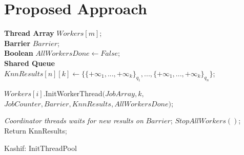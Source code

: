 \section{Proposed Approach}
\label{sec:system-architecture}

\iffalse
\small
\begin{algorithm}
	\DontPrintSemicolon
	\caption{{\sc BuildIndex}}
	\label{algo:build_index}
\end{algorithm}

\small
\fi




\small
\begin{algorithm}
	\DontPrintSemicolon %
	
	\vspace{.2cm}
	\textbf{Thread Array} $Workers[m]$;\\
	\textbf{Barrier} $Barrier$; \\
	\textbf{Boolean} $AllWorkersDone \gets False$;\\
	\textbf{Shared Queue} $KnnResults[n][k] \gets \{\{+\infty_{1}, ..., +\infty_{k}\}_{q_{1}}, ..., \{+\infty_{1}, ..., +\infty_{k}\}_{q_{n}}\}$;\\
	\vspace{.2cm}
	
	{
		$Workers[i].${\sc InitWorkerThread}$(JobArray, k, $\\ $JobCounter, Barrier, KnnResults, AllWorkersDone)$;\\
	}
	
	{
		{\it Coordinator threads waits for new results on} $Barrier$;
		{
			$StopAllWorkers()$;\\
			Return {KnnResults};
		}
	}
	
	\caption{{\sc Kashif: InitThreadPool}}
	\label{algo:coordinator}
\end{algorithm}




